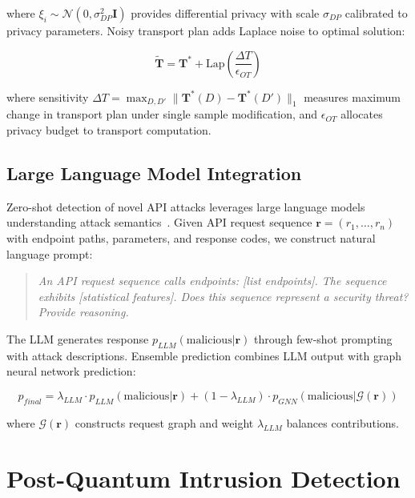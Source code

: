 where $\xi_i \sim \mathcal{N}(0, \sigma_{DP}^2 \mathbf{I})$ provides differential privacy with scale $\sigma_{DP}$ calibrated to privacy parameters. Noisy transport plan adds Laplace noise to optimal solution:

\begin{equation}
\tilde{\mathbf{T}} = \mathbf{T}^* + \text{Lap}\left(\frac{\Delta T}{\epsilon_{OT}}\right)
\end{equation}

where sensitivity $\Delta T = \max_{D, D'} \|\mathbf{T}^*(D) - \mathbf{T}^*(D')\|_1$ measures maximum change in transport plan under single sample modification, and $\epsilon_{OT}$ allocates privacy budget to transport computation.

\subsection{Large Language Model Integration}

Zero-shot detection of novel API attacks leverages large language models~\cite{brown2020language,devlin2019bert} understanding attack semantics~\cite{wei2022chain,fang2023llm4ids}. Given API request sequence $\mathbf{r} = (r_1, \ldots, r_n)$ with endpoint paths, parameters, and response codes, we construct natural language prompt:

\begin{quote}
\textit{An API request sequence calls endpoints: [list endpoints]. The sequence exhibits [statistical features]. Does this sequence represent a security threat? Provide reasoning.}
\end{quote}

The LLM generates response $p_{LLM}(\text{malicious} | \mathbf{r})$ through few-shot prompting with attack descriptions. Ensemble prediction combines LLM output with graph neural network prediction:

\begin{equation}
p_{final} = \lambda_{LLM} \cdot p_{LLM}(\text{malicious}|\mathbf{r}) + (1-\lambda_{LLM}) \cdot p_{GNN}(\text{malicious}|\mathcal{G}(\mathbf{r}))
\end{equation}

where $\mathcal{G}(\mathbf{r})$ constructs request graph and weight $\lambda_{LLM}$ balances contributions.

\section{Post-Quantum Intrusion Detection}
\label{sec:models_pqidps}

